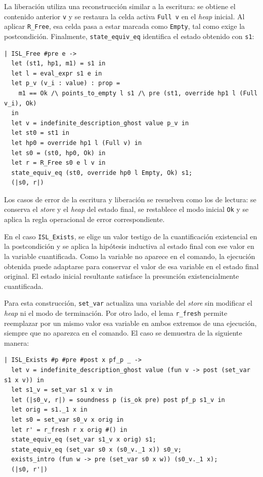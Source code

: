 \documentclass[a4paper,	11pt]{report}
\begin{document}
La liberación utiliza una reconstrucción similar a la escritura:
se obtiene el contenido anterior \lstinline|v| y se restaura la celda activa \lstinline|Full v| en el \emph{heap} inicial.
Al aplicar \lstinline|R_Free|,
esa celda pasa a estar marcada como \lstinline|Empty|,
tal como exige la postcondición.
Finalmente,
\lstinline|state_equiv_eq| identifica el estado obtenido con \lstinline|s1|:


\begin{lstlisting}
| ISL_Free #pre e -> 
  let (st1, hp1, m1) = s1 in
  let l = eval_expr s1 e in
  let p_v (v_i : value) : prop = 
    m1 == Ok /\ points_to_empty l s1 /\ pre (st1, override hp1 l (Full v_i), Ok) 
  in
  let v = indefinite_description_ghost value p_v in
  let st0 = st1 in
  let hp0 = override hp1 l (Full v) in
  let s0 = (st0, hp0, Ok) in
  let r = R_Free s0 e l v in
  state_equiv_eq (st0, override hp0 l Empty, Ok) s1;
  (|s0, r|)
\end{lstlisting}

Los casos de error de la escritura y liberación se resuelven como los de lectura:
se conserva el \emph{store} y el \emph{heap} del estado final,
se restablece el modo inicial \lstinline|Ok| y se aplica la regla operacional de error correspondiente.

En el caso \lstinline|ISL_Exists|,
se elige un valor testigo de la cuantificación existencial en la postcondición
y se aplica la hipótesis inductiva al estado final con ese valor en la variable cuantificada.
Como la variable no aparece en el comando,
la ejecución obtenida puede adaptarse para conservar el valor de esa variable en el estado final original.
El estado inicial resultante satisface la presunción existencialmente cuantificada.

Para esta construcción,
\lstinline|set_var| actualiza una variable del \emph{store} sin modificar el \emph{heap} ni el modo de terminación.
Por otro lado,
el lema \lstinline|r_fresh| permite reemplazar por un mismo valor esa variable en ambos extremos de una ejecución,
siempre que no aparezca en el comando.
El caso se demuestra de la siguiente manera:

\begin{lstlisting}
| ISL_Exists #p #pre #post x pf_p _ ->
  let v = indefinite_description_ghost value (fun v -> post (set_var s1 x v)) in
  let s1_v = set_var s1 x v in
  let (|s0_v, r|) = soundness p (is_ok pre) post pf_p s1_v in
  let orig = s1._1 x in
  let s0 = set_var s0_v x orig in
  let r' = r_fresh r x orig #() in
  state_equiv_eq (set_var s1_v x orig) s1;
  state_equiv_eq (set_var s0 x (s0_v._1 x)) s0_v;
  exists_intro (fun w -> pre (set_var s0 x w)) (s0_v._1 x);
  (|s0, r'|)
\end{lstlisting}
\end{document}
